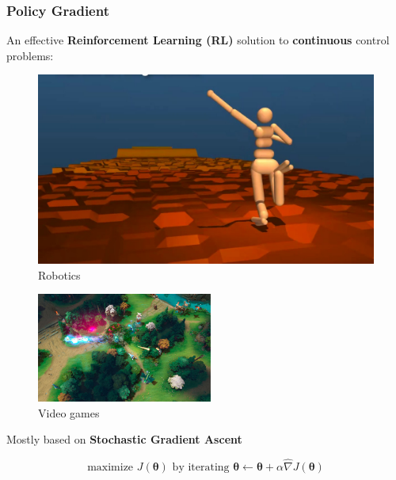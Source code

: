 \documentclass[aspectratio=169]{beamer}
\newcommand{\enb}[1]{\textcolor{poliblue1}{\textbf{#1}}}
\newcommand{\vtheta}{\boldsymbol{\theta}}
\begin{document}
\begin{frame} 
\frametitle{Policy Gradient} 
An effective \enb{Reinforcement Learning (RL)} solution to \enb{continuous} control problems:

\begin{minipage}[t]{.4\paperwidth}
\begin{figure}
\includegraphics[width=\textwidth]{images/parkour.jpg}
\caption{Robotics~\citep{heess2017emergence}}
\end{figure}
\end{minipage}
\hfill%
\begin{minipage}[t]{.4\paperwidth}
\begin{figure}
\includegraphics[width=\textwidth, height=3.6cm]{images/dota.jpg}
\caption{Video games~\citep{openaifive}}
\end{figure}	
\end{minipage}

\vspace*{.3cm}

\large{Mostly based on \enb{Stochastic Gradient Ascent}~\citep{robbins1951stochastic}}

\begin{equation*}
\text{maximize } J(\vtheta) \text{ by iterating } \vtheta \gets \vtheta + \alpha \widehat{\nabla}J(\vtheta)
\end{equation*}

\end{frame}
\end{document}
